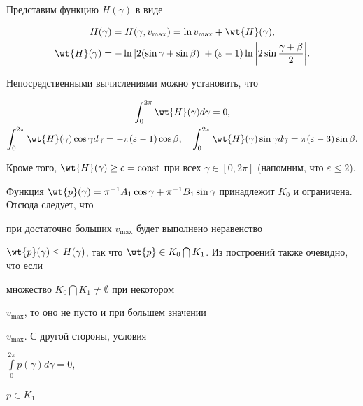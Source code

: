 \begin{pf}


Представим функцию $H(\gamma)$ в виде


\begin{gather*}


H(\gamma)=H(\gamma, v_{\max})=\ln v_{\max} +\wt{H}(\gamma),\\


%


\wt{H}(\gamma)=-\ln |2(\sin\gamma + \sin\beta)|


+(\varepsilon-1)\ln \bigg|2\sin \frac{\gamma+\beta}{2}\bigg|.


\end{gather*}


Непосредственными вычислениями можно установить, что


\begin{gather}\label {4}


\int_{0}^{2\pi} \wt{H}(\gamma) d\gamma=0, \\


%


\int_{0}^{2\pi} \wt{H}(\gamma) \cos \gamma d\gamma=-\pi(\varepsilon-1)\cos


\beta,\quad \int_{0}^{2\pi} \wt{H}(\gamma) \sin \gamma d\gamma=


\pi(\varepsilon-3)\sin \beta.\notag


\end{gather}


Кроме того, $\wt{H}(\gamma)\geq c=\const$ при всех $\gamma \in


[0,2\pi]$ (напомним, что $\varepsilon\le2$).


Функция $\wt{p}(\gamma)=\pi^{-1}A_{1}\cos \gamma + \pi^{-1}B_{1}\sin


\gamma$ принадлежит $K_{0}$ и ограничена. Отсюда следует, что


при достаточно больших $ v_{\max}$ будет выполнено неравенство


$\wt{p}(\gamma)\leq H(\gamma)$, так что $\wt{p} \in


K_{0}\bigcap K_{1}$. Из построений также очевидно, что если


множество $K_{0}\bigcap K_{1}\neq \emptyset$ при некотором


$v_{\max}$, то оно не пусто и при большем значении


$v_{\max}$. С другой стороны, условия


$\int\limits_{0}^{2\pi} p(\gamma) d\gamma=0$,


$p \in K_{1}$



\end{pf}
